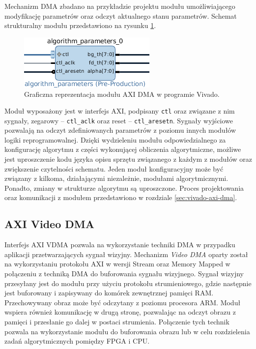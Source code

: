 Mechanizm DMA zbadano na przykładzie projektu modułu umożliwiającego modyfikację parametrów oraz odczyt aktualnego stanu parametrów. 
Schemat strukturalny modułu przedstawiono na rysunku \ref{fig:axi-dma-diagram}.

\begin{figure}[h]
	\centering
	\includegraphics[]{img/algorithm-parameters.png}
	\caption{Graficzna reprezentacja modułu AXI DMA w programie Vivado.}
	\label{fig:axi-dma-diagram}
\end{figure}

Moduł wyposażony jest w interfejs AXI, podpisany \texttt{ctl} oraz związane z nim sygnały, zegarowy -- \texttt{ctl\_aclk} oraz reset -- \texttt{ctl\_aresetn}. 
Sygnały wyjściowe pozwalają na odczyt zdefiniowanych parametrów z poziomu innych modułów logiki reprogramowalnej. 
Dzięki wydzieleniu modułu odpowiedzialnego za konfigurację algorytmu z części wykonującej obliczenia algorytmiczne, możliwe jest uproszczenie kodu języka opisu sprzętu związanego z każdym z modułów oraz zwiększenie czytelności schematu. 
Jeden moduł konfiguracyjny może być związany z kilkoma, działającymi niezależnie, modułami algorytmicznymi. 
Ponadto, zmiany w strukturze algorytmu są uproszczone.
Proces projektowania oraz komunikacji z modułem przedstawiono w rozdziale \ref{sec:vivado-axi-dma}. %


\subsection{AXI Video DMA}
\label{sec:axi-vdma}
Interfejs AXI VDMA pozwala na wykorzystanie techniki DMA w przypadku aplikacji przetwarzających sygnał wizyjny. %
Mechanizm \emph{Video DMA} oparty został na wykorzystaniu protokołu AXI w wersji Stream oraz Memory Mapped w połączeniu z techniką DMA do buforowania sygnału wizyjnego. 
Sygnał wizyjny przesyłany jest do modułu przy użyciu protokołu strumieniowego, gdzie następnie jest buforowany i zapisywany do komórek zewnętrznej pamięci RAM. %
Przechowywany obraz może być odczytany z poziomu procesora ARM. %
Moduł wspiera również komunikację w drugą stronę, pozwalając na odczyt obrazu z pamięci i przesłanie go dalej w postaci strumienia. 
Połączenie tych technik pozwala na wykorzystanie modułu do buforowania obrazu lub w celu rozdzielenia zadań algorytmicznych pomiędzy FPGA i CPU.

